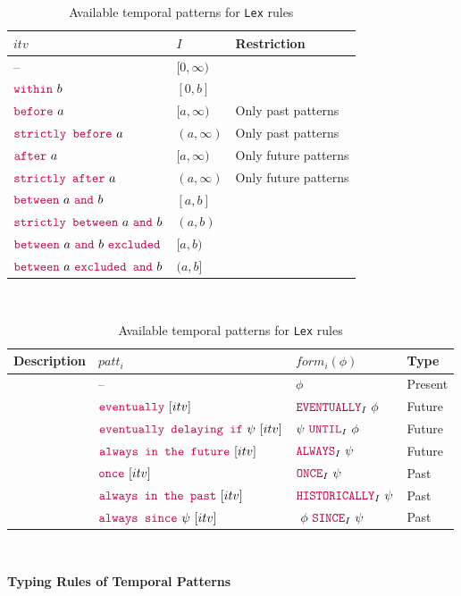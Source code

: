 \documentclass[runningheads]{llncs}
\newcommand{\Lex}{\texttt{Lex}}
\newcommand{\kw}[1]{{\color{purple}\texttt{#1}}}
\begin{document}
\begin{table}
  \centering
  \begin{tabular}{lll}
    \hline
    $itv$ & $I$ & Restriction \\
    \hline
    -- & $[0,\infty)$\\
    $\kw{within}~b$ & $[0,b]$ \\
    $\kw{before}~a$ & $[a,\infty)$ & Only past patterns \\
    $\kw{strictly before}~a$ & $(a,\infty)$ & Only past patterns \\
    $\kw{after}~a$ & $[a,\infty)$ & Only future patterns \\
    $\kw{strictly after}~a$ & $(a,\infty)$ & Only future patterns \\
    $\kw{between}~a~\kw{and}~b$ & $[a,b]$ \\
    $\kw{strictly between}~a~\kw{and}~b$ & $(a,b)$ \\
    $\kw{between}~a~\kw{and}~b~\kw{excluded}$ & $[a,b)$ \\
    $\kw{between}~a~\kw{excluded and}~b$ & $(a,b]$ \\
  \end{tabular}\\[10pt]
    \begin{tabular}{llll}
    \hline
  Description & $patt_i$ & $form_i(\phi)$ & Type \\
    \hline
              & -- & $\phi$ & Present\\
              & $\kw{eventually}~[itv]$ & $\kw{EVENTUALLY}_I~\phi$ & Future\\
              & $\kw{eventually delaying if}~\psi~[itv]$ & $\psi~\kw{UNTIL}_I~\phi$ & Future\\
              & $\kw{always in the future}~[itv]$ & $\kw{ALWAYS}_I~\psi$ & Future\\
              & $\kw{once}~[itv]$ & $\kw{ONCE}_I~\psi$ & Past\\
              & $\kw{always in the past}~[itv]$ & $\kw{HISTORICALLY}_I~\psi$ & Past\\
              & $\kw{always since}~\psi~[itv]$ & $~\phi~\kw{SINCE}_I~\psi$ & Past\\ %
\end{tabular}\\[10pt]
\caption{Available temporal patterns for \Lex{} rules\label{tab:patterns}}
\end{table}

\textbf{Typing Rules of Temporal Patterns}
\end{document}
